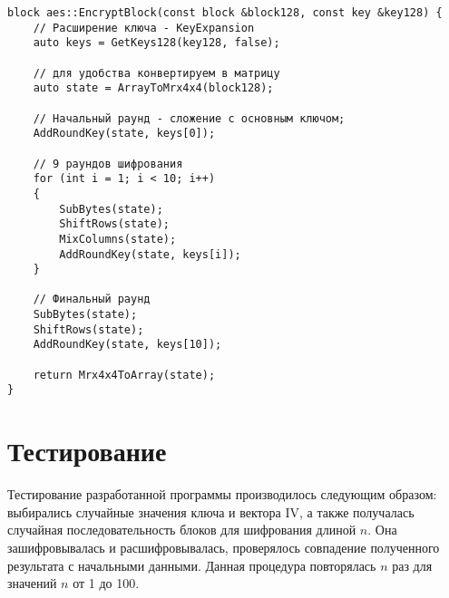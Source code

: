 \clearpage

\begin{lstlisting}[label=lst:AES-m,caption=Реализация алгоритма AES]
block aes::EncryptBlock(const block &block128, const key &key128) {
	// Расширение ключа - KeyExpansion
	auto keys = GetKeys128(key128, false);
	
	// для удобства конвертируем в матрицу
	auto state = ArrayToMrx4x4(block128);
	
	// Начальный раунд - сложение с основным ключом;
	AddRoundKey(state, keys[0]);
	
	// 9 раундов шифрования
	for (int i = 1; i < 10; i++)
	{
		SubBytes(state);
		ShiftRows(state);
		MixColumns(state);
		AddRoundKey(state, keys[i]);
	}
	
	// Финальный раунд
	SubBytes(state);
	ShiftRows(state);
	AddRoundKey(state, keys[10]);
	
	return Mrx4x4ToArray(state);
}
\end{lstlisting}


\section{Тестирование}

Тестирование разработанной программы производилось следующим образом: выбирались случайные значения ключа и вектора IV, а также получалась случайная последовательность блоков для шифрования длиной $n$. Она зашифровывалась и расшифровывалась, проверялось совпадение полученного результата с начальными данными. Данная процедура повторялась $n$ раз для значений $n$ от 1 до 100.

